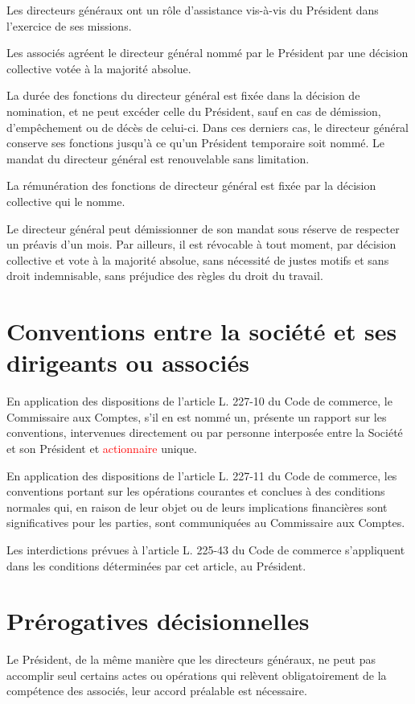 \documentclass[a4paper,12pt]{report}
\begin{document}
Les directeurs généraux ont un rôle d'assistance vis-à-vis du Président dans l'exercice de ses missions.

Les associés agréent le directeur général nommé par le Président par une décision collective votée à la majorité absolue.

La durée des fonctions du directeur général est fixée dans la décision de nomination, et ne peut excéder celle du Président, sauf en cas de démission, 
d'empêchement ou de décès de celui-ci. 
Dans ces derniers cas, le directeur général conserve ses fonctions jusqu'à ce qu'un Président temporaire soit nommé. 
Le mandat du directeur général est renouvelable sans limitation.

La rémunération des fonctions de directeur général est fixée par la décision collective qui le nomme.

Le directeur général peut démissionner de son mandat sous réserve de respecter un préavis d'un mois. 
Par ailleurs, il est révocable à tout moment, par décision collective et vote à la majorité absolue, 
sans nécessité de justes motifs et sans droit indemnisable, sans préjudice des règles du droit du travail.

\section{Conventions entre la société et ses dirigeants ou associés}
En application des dispositions de l'article L. 227-10 du Code de commerce, le Commissaire aux Comptes, s'il en est nommé un, présente un rapport sur les conventions, 
intervenues directement ou par personne interposée entre la Société et son Président et \textcolor{red}{actionnaire} unique.

En application des dispositions de l'article L. 227-11 du Code de commerce, les conventions portant sur les opérations courantes et conclues à des conditions normales qui, 
en raison de leur objet ou de leurs implications financières sont significatives pour les parties, sont communiquées au Commissaire aux Comptes.

Les interdictions prévues à l'article L. 225-43 du Code de commerce s'appliquent dans les conditions déterminées par cet article, au Président.

\section{Prérogatives décisionnelles}
Le Président, de la même manière que les directeurs généraux, ne peut pas accomplir seul certains actes ou opérations 
qui relèvent obligatoirement de la compétence des associés, leur accord préalable est nécessaire.
\end{document}
